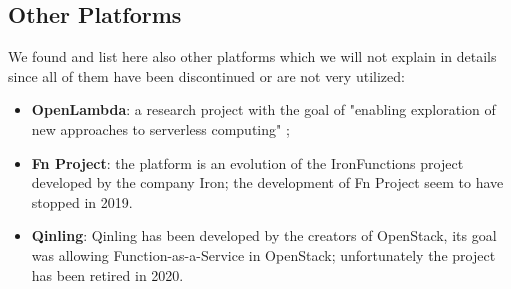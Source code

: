 \subsection{Other Platforms}
We found and list here also other platforms which we will not explain in details since all of them have been discontinued or are not very utilized:
\begin{itemize}
    \item \textbf{OpenLambda}: a research project with the goal of "enabling exploration of new approaches to serverless computing" \cite{openlambda};
    \item \textbf{Fn Project}: the platform is an evolution of the IronFunctions project developed by the company Iron; the development of Fn Project seem to have stopped in 2019.
    \item \textbf{Qinling}: Qinling has been developed by the creators of OpenStack, its goal was allowing Function-as-a-Service in OpenStack; unfortunately the project has been retired in 2020.
\end{itemize}

